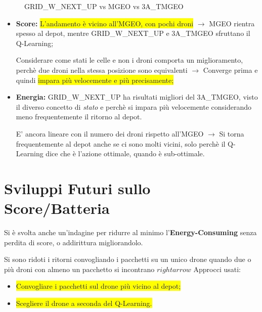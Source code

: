 \documentclass[12pt]{article}
\begin{document}
\begin{figure}[H]
    
    \qquad
    \caption{GRID\_W\_NEXT\_UP vs MGEO vs 3A\_TMGEO}%
    \label{fig:example}%
\end{figure}

\begin{itemize}

    \item \textbf{Score:} \colorbox{yellow}{L'andamento è vicino all'MGEO, con pochi droni} $\rightarrow$ MGEO rientra spesso al depot, mentre GRID\_W\_NEXT\_UP e 3A\_TMGEO sfruttano il Q-Learning; 
    
    Considerare come stati le celle e non i droni comporta un miglioramento, perchè due droni nella stessa posizione sono equivalenti $\rightarrow$ Converge prima e quindi \colorbox{yellow}{impara più velocemente e più precisamente;}
    
    \item \textbf{Energia:} GRID\_W\_NEXT\_UP ha risultati migliori del 3A\_TMGEO, visto il diverso concetto di \textit{stato} e perchè si impara più velocemente considerando meno frequentemente il ritorno al depot.
    
    E' ancora lineare con il numero dei droni rispetto all'MGEO $\rightarrow$ Si torna frequentemente al depot anche se ci sono molti vicini, solo perchè il Q-Learning dice che è l'azione ottimale, quando è sub-ottimale.

\end{itemize}


\section{Sviluppi Futuri sullo Score/Batteria}

Si è svolta anche un'indagine per ridurre al minimo l'\textbf{Energy-Consuming} senza perdita di score, o addirittura migliorandolo.

Si sono ridoti i ritorni convogliando i pacchetti su un unico drone quando due o più droni con almeno un pacchetto si incontrano $rightarrow$ Approcci usati: 

\begin{itemize}

    \item \colorbox{yellow}{Convogliare i pacchetti sul drone più vicino al depot;}
    
    \item \colorbox{yellow}{Scegliere il drone a seconda del Q-Learning.}
    
\end{itemize}
\end{document}
